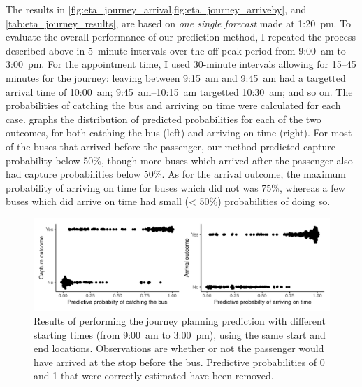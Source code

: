 The results in \cref{fig:eta_journey_arrival,fig:eta_journey_arriveby}, and \cref{tab:eta_journey_results}, are based on \emph{one single forecast} made at  1:20~pm. To evaluate the overall performance of our prediction method, I repeated the process described above in 5~minute intervals over the off-peak period from  9:00~am to  3:00~pm. For the appointment time, I used 30-minute intervals allowing for 15--45 minutes for the journey: leaving between 9:15~am and 9:45~am had a targetted arrival time of 10:00~am; 9:45~am--10:15~am targetted 10:30~am; and so on. The probabilities of catching the bus and arriving on time were calculated for each case.  graphs the distribution of predicted probabilities for each of the two outcomes, for both catching the bus (left) and arriving on time (right). For most of the buses that arrived before the passenger, our method predicted capture probability below 50\%, though more buses which arrived after the passenger also had capture probabilities below 50\%. As for the arrival outcome, the maximum probability of arriving on time for buses which did not was 75\%, whereas a few buses which did arrive on time had small (< 50\%) probabilities of doing so.


\begin{knitrout}\small
{}\color{fgcolor}\begin{figure}

{\centering \includegraphics[width=\textwidth]{figure/eta_journey_results_avg-1} 

}

\caption[Results of performing the journey planning prediction with different starting times]{Results of performing the journey planning prediction with different starting times (from  9:00~am to  3:00~pm), using the same start and end locations. Observations are whether or not the passenger would have arrived at the stop before the bus. Predictive probabilities of 0 and 1 that were correctly estimated have been removed.}\label{fig:eta_journey_results_avg}
\end{figure}


\end{knitrout}

